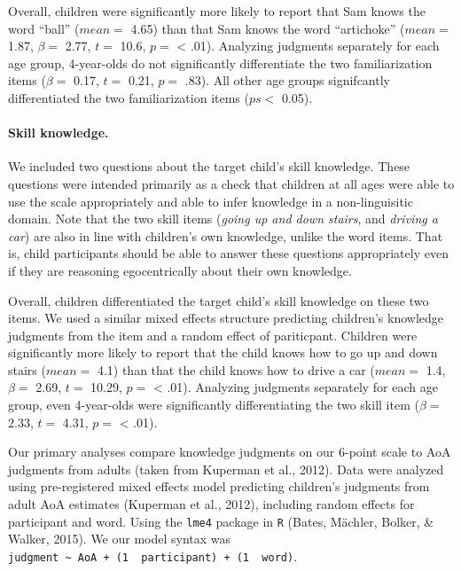 \documentclass[10pt, letterpaper]{article}
\begin{document}
Overall, children were significantly more likely to report that Sam
knows the word ``ball'' (\(mean =\) 4.65) than that Sam knows the word
``artichoke'' (\(mean =\) 1.87, \(\beta =\) 2.77, \(t =\) 10.6, \(p =\)
\textless{} .01). Analyzing judgments separately for each age group,
4-year-olds do not significantly differentiate the two familiarization
items (\(\beta =\) 0.17, \(t =\) 0.21, \(p =\) .83). All other age
groups signifcantly differentiated the two familiarization items
(\(ps <\) 0.05).

\hypertarget{skill-knowledge.}{%
\paragraph{Skill knowledge.}\label{skill-knowledge.}}

We included two questions about the target child's skill knowledge.
These questions were intended primarily as a check that children at all
ages were able to use the scale appropriately and able to infer
knowledge in a non-linguisitic domain. Note that the two skill items
(\emph{going up and down stairs}, and \emph{driving a car}) are also in
line with children's own knowledge, unlike the word items. That is,
child participants should be able to answer these questions
appropriately even if they are reasoning egocentrically about their own
knowledge.

Overall, children differentiated the target child's skill knowledge on
these two items. We used a similar mixed effects structure predicting
children's knowledge judgments from the item and a random effect of
pariticpant. Children were significantly more likely to report that the
child knows how to go up and down stairs (\(mean =\) 4.1) than that the
child knows how to drive a car (\(mean =\) 1.4, \(\beta =\) 2.69,
\(t =\) 10.29, \(p =\) \textless{} .01). Analyzing judgments separately
for each age group, even 4-year-olds were significantly differentiating
the two skill item (\(\beta =\) 2.33, \(t =\) 4.31, \(p =\) \textless{}
.01).

Our primary analyses compare knowledge judgments on our 6-point scale to
AoA judgments from adults (taken from Kuperman et al., 2012). Data were
analyzed using pre-registered mixed effects model predicting children's
judgments from adult AoA estimates (Kuperman et al., 2012), including
random effects for participant and word. Using the \texttt{lme4} package
in \texttt{R} (Bates, Mächler, Bolker, \& Walker, 2015). We our model
syntax was
\texttt{judgment\ \textasciitilde{}\ AoA\ +\ (1\ \textbar{}\ participant)\ +\ (1\ \textbar{}\ word)}.
\end{document}
